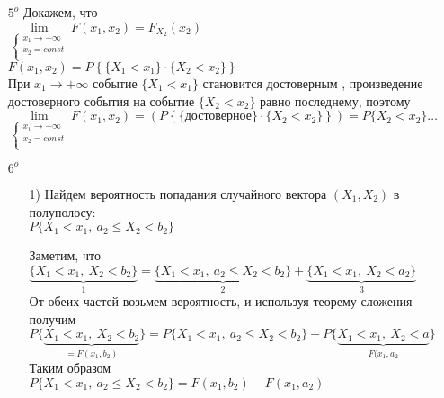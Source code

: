 \begin{enumerate}
\item[$5^o$] Докажем, что \\
$\lim\limits_{\begin{cases} x_1 \to +\infty \\ x_2 = const \\ \end{cases}} F(x_1, x_2) = F_{X_2}(x_2)$ \\
$F(x_1, x_2) = P\left\{ \{X_1 < x_1\} \cdot \{X_2 < x_2\} \right\}$ \\
При $x_1 \to +\infty$ событие $\{X_1 < x_1\}$ становится достоверным , произведение достоверного события на событие $\{X_2 < x_2\}$ равно последнему, поэтому \\
$\lim\limits_{\begin{cases} x_1 \to +\infty \\ x_2 = const \\ \end{cases}} F(x_1, x_2) = \left( P\left\{ \{\text{достоверное}\} \cdot \{X_2 < x_2\} \right\} \right) = P\{X_2 < x_2\} \ldots$ \\

\item[$6^o$] 
	\begin{enumerate}
	\item[1)] Найдем вероятность попадания случайного вектора $(X_1, X_2)$ в полуполосу: \\
	$P\{X_1 < x_1, \ a_2 \leqslant X_2 < b_2\}$ 
	
	Заметим, что \\
	$\underbrace{\{X_1 < x_1, \ X_2 < b_2\}}_{1} = \underbrace{\{X_1 < x_1, \ a_2 \leqslant X_2 < b_2\}}_{2} + \underbrace{\{X_1 < x_1, \ X_2 < a_2\}}_{3}$ \\
	От обеих частей возьмем вероятность, и используя теорему сложения получим \\
	$P\{\underbrace{X_1 < x_1, \ X_2 < b_2}_{= F(x_1, b_2)}\} = P\{X_1 < x_1, \ a_2 \leqslant X_2 < b_2\} + P\{\underbrace{X_1 < x_1, \ X_2 < a}_{F(x_1, a_2}\}$ \\
	Таким образом \\
	$P\{X_1 < x_1, \ a_2 \leqslant X_2 < b_2\} = F(x_1, b_2) - F(x_1, a_2)$ \\
	

\end{enumerate}
\end{enumerate}

